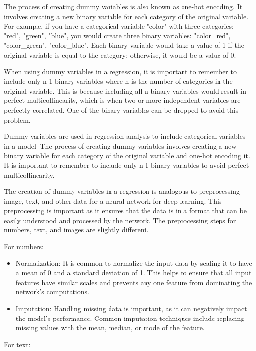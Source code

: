 The process of creating dummy variables is also known as one-hot encoding. It involves creating a new binary variable for each category of the original variable. For example, if you have a categorical variable "color" with three categories: "red", "green", "blue", you would create three binary variables: "color\_red", "color\_green", "color\_blue". Each binary variable would take a value of 1 if the original variable is equal to the category; otherwise, it would be a value of 0.

When using dummy variables in a regression, it is important to remember to include only n-1 binary variables where n is the number of categories in the original variable. This is because including all n binary variables would result in perfect multicollinearity, which is when two or more independent variables are perfectly correlated. One of the binary variables can be dropped to avoid this problem.

Dummy variables are used in regression analysis to include categorical variables in a model. The process of creating dummy variables involves creating a new binary variable for each category of the original variable and one-hot encoding it. It is important to remember to include only n-1 binary variables to avoid perfect multicollinearity.

The creation of dummy variables in a regression is analogous to preprocessing image, text, and other data for a neural network for deep learning. This preprocessing is important as it ensures that the data is in a format that can be easily understood and processed by the network. The preprocessing steps for numbers, text, and images are slightly different.

For numbers:
\begin{itemize}
	\item Normalization: It is common to normalize the input data by scaling it to have a mean of 0 and a standard deviation of 1. This helps to ensure that all input features have similar scales and prevents any one feature from dominating the network’s computations.
	\item Imputation: Handling missing data is important, as it can negatively impact the model’s performance. Common imputation techniques include replacing missing values with the mean, median, or mode of the feature.
\end{itemize}

For text:

